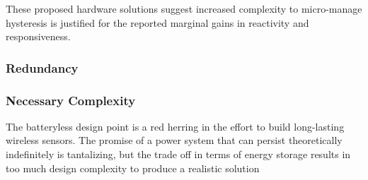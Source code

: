 

These proposed hardware solutions suggest increased complexity to micro-manage hysteresis is justified for the reported marginal gains in reactivity and responsiveness.



\subsubsection{Redundancy}

\subsubsection{Necessary Complexity}
The batteryless design point is a red herring in the effort to build long-lasting wireless sensors. The promise of a power system that can persist theoretically indefinitely is tantalizing, but the trade off in terms of energy storage results in too much design complexity to produce a realistic solution

